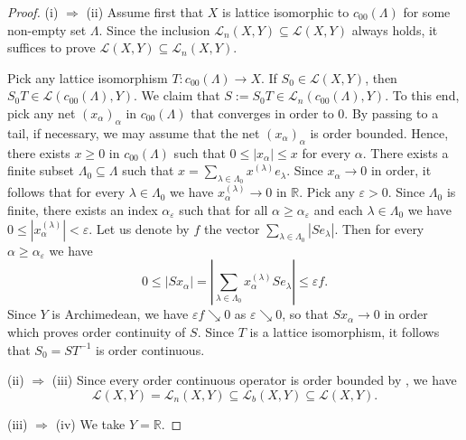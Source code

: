 \documentclass[12pt,reqno]{amsart}
\theoremstyle{plain}
\theoremstyle{definition}
\begin{document}
\begin{proof}
(i) $\Rightarrow$ (ii)
Assume first that $X$ is lattice isomorphic to $c_{00}(\Lambda)$ for some non-empty set $\Lambda$. Since the inclusion $\mathscr L_n(X,Y)\subseteq \mathscr L(X,Y)$ always holds, it suffices to prove $\mathscr L(X,Y)\subseteq \mathscr L_n(X,Y)$.

Pick any lattice isomorphism $T\colon c_{00}(\Lambda)\to X$. If $S_0\in \mathscr L(X,Y)$, then $S_0T\in \mathscr L(c_{00}(\Lambda),Y)$. We claim that $S:=S_0T\in \mathscr L_n(c_{00}(\Lambda),Y)$. To this end, pick any net $(x_\alpha)_\alpha$ in $c_{00}(\Lambda)$ that converges in order to $0$. By passing to a tail, if necessary, we may assume that the net $(x_\alpha)_\alpha$ is order bounded. Hence, there exists $x\geq 0$ in $c_{00}(\Lambda)$ such that $0 \leq |x_\alpha|\leq x$ for every $\alpha$. There exists a finite subset $\Lambda_0\subseteq \Lambda$ such that $x=\sum_{\lambda\in\Lambda_0}x^{(\lambda)} e_\lambda$. Since $x_\alpha\to 0$ in order, it follows that for every $\lambda\in \Lambda_0$ we have  $x_\alpha^{(\lambda)}\to 0$ in $\mathbb R$. Pick any $\varepsilon>0$. Since $\Lambda_0$ is finite, there exists an index $\alpha_\varepsilon$ such that for all $\alpha\geq \alpha_\varepsilon$ and each $\lambda\in \Lambda_0$ we have $0 \leq |x_\alpha^{(\lambda)}|<\varepsilon$. Let us denote by  $f$ the vector $\sum_{\lambda\in \Lambda_0}|Se_\lambda|$. Then for every $\alpha\geq \alpha_\varepsilon$ we have
$$0\leq |Sx_\alpha|=\left|\sum_{\lambda\in \Lambda_0}x_\alpha^{(\lambda)}Se_\lambda\right|\leq \varepsilon f.$$
Since $Y$ is Archimedean, we have $\varepsilon f \searrow 0$ as $\varepsilon \searrow 0$, so that $Sx_\alpha\to 0$ in order which proves order continuity of $S$. Since $T$ is a lattice isomorphism, it follows that
$S_0=ST^{-1}$ is order continuous.

(ii) $\Rightarrow$ (iii)
Since every order continuous operator is order bounded by \cite[Theorem 2.1]{AS05}, we have
$$\mathscr L(X,Y) = \mathscr L_n(X,Y) \subseteq \mathscr L_b(X,Y)\subseteq  \mathscr L(X,Y).$$

(iii) $\Rightarrow$ (iv) We take $Y=\mathbb R$. 


\end{proof}
\end{document}
